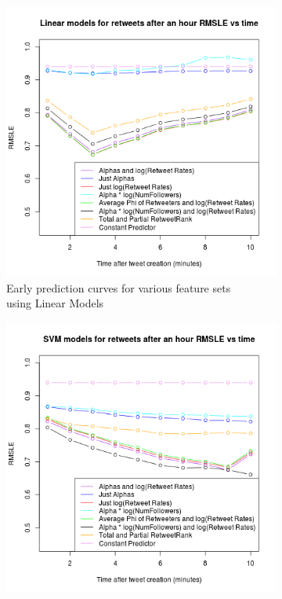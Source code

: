 \begin{figure}
  \centering
  \begin{subfigure}[b]{0.45\textwidth}
    \includegraphics[width=\textwidth]{../src/Analysis/linearattempts.png}
    \caption{Early prediction curves for various feature sets\\ using Linear Models}
    \label{fig:linearattempts}  
  \end{subfigure}%
  \begin{subfigure}[b]{0.45\textwidth}
    \includegraphics[width=\textwidth]{../src/Analysis/svmattempts.png}

\end{subfigure}
\end{figure}
